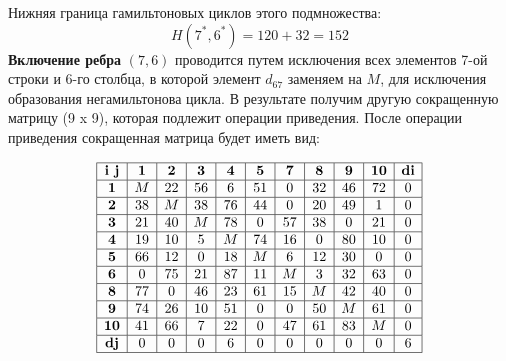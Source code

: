 \documentclass[17pt]{extarticle}
\begin{document}
Нижняя граница гамильтоновых циклов этого подмножества:
\[ H(7^*,6^*) = 120 + 32 = 152 \]
\textbf{Включение ребра} \((7,6)\) проводится путем исключения всех элементов 7-ой строки и 6-го столбца, в которой элемент \( d_{67} \) заменяем на \( M \), для исключения образования негамильтонова цикла.
В результате получим другую сокращенную матрицу (9 x 9), которая подлежит операции приведения.
После операции приведения сокращенная матрица будет иметь вид:

\[
    \begin{array}{|c|c|c|c|c|c|c|c|c|c|c|}
        \hline
        \textbf{i j} & \textbf{1} & \textbf{2} & \textbf{3} & \textbf{4} & \textbf{5} & \textbf{7} & \textbf{8} & \textbf{9} & \textbf{10} & \textbf{di} \\
        \hline
        \textbf{1}   & M          & 22         & 56         & 6          & 51         & 0          & 32         & 46         & 72          & 0           \\
        \hline
        \textbf{2}   & 38         & M          & 38         & 76         & 44         & 0          & 20         & 49         & 1           & 0           \\
        \hline
        \textbf{3}   & 21         & 40         & M          & 78         & 0          & 57         & 38         & 0          & 21          & 0           \\
        \hline
        \textbf{4}   & 19         & 10         & 5          & M          & 74         & 16         & 0          & 80         & 10          & 0           \\
        \hline
        \textbf{5}   & 66         & 12         & 0          & 18         & M          & 6          & 12         & 30         & 0           & 0           \\
        \hline
        \textbf{6}   & 0          & 75         & 21         & 87         & 11         & M          & 3          & 32         & 63          & 0           \\
        \hline
        \textbf{8}   & 77         & 0          & 46         & 23         & 61         & 15         & M          & 42         & 40          & 0           \\
        \hline
        \textbf{9}   & 74         & 26         & 10         & 51         & 0          & 0          & 50         & M          & 61          & 0           \\
        \hline
        \textbf{10}  & 41         & 66         & 7          & 22         & 0          & 47         & 61         & 83         & M           & 0           \\
        \hline
        \textbf{dj}  & 0          & 0          & 0          & 6          & 0          & 0          & 0          & 0          & 0           & 6           \\
        \hline
    \end{array}
\]
\end{document}
